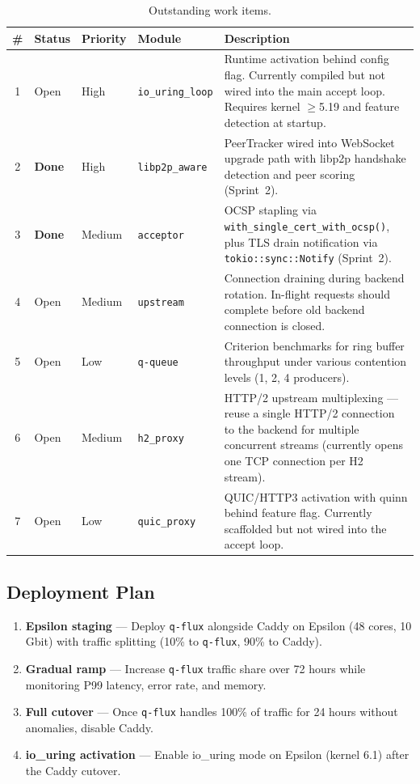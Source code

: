 \documentclass[a4paper, 11pt]{article}
\newcommand{\qflux}{\texttt{q-flux}}
\begin{document}
\begin{table}[H]
\centering
\caption{Outstanding work items.}
\label{tab:remaining}
\begin{tabular}{@{}clllp{5.5cm}@{}}
\toprule
\textbf{\#} & \textbf{Status} & \textbf{Priority} & \textbf{Module} & \textbf{Description} \\
\midrule
1 & Open   & High   & \texttt{io\_uring\_loop} &
  Runtime activation behind config flag.  Currently compiled but not
  wired into the main accept loop.  Requires kernel $\geq$5.19 and
  feature detection at startup. \\
2 & \textcolor{codegreen}{\textbf{Done}} & High   & \texttt{libp2p\_aware} &
  PeerTracker wired into WebSocket upgrade path with libp2p handshake
  detection and peer scoring (Sprint~2). \\
3 & \textcolor{codegreen}{\textbf{Done}} & Medium & \texttt{acceptor} &
  OCSP stapling via \texttt{with\_single\_cert\_with\_ocsp()}, plus
  TLS drain notification via \texttt{tokio::sync::Notify} (Sprint~2). \\
4 & Open   & Medium & \texttt{upstream} &
  Connection draining during backend rotation.  In-flight requests
  should complete before old backend connection is closed. \\
5 & Open   & Low    & \texttt{q-queue} &
  Criterion benchmarks for ring buffer throughput under various
  contention levels (1, 2, 4 producers). \\
6 & Open   & Medium & \texttt{h2\_proxy} &
  HTTP/2 upstream multiplexing --- reuse a single HTTP/2 connection to
  the backend for multiple concurrent streams (currently opens one TCP
  connection per H2 stream). \\
7 & Open   & Low    & \texttt{quic\_proxy} &
  QUIC/HTTP3 activation with quinn behind feature flag.  Currently
  scaffolded but not wired into the accept loop. \\
\bottomrule
\end{tabular}
\end{table}

\subsection{Deployment Plan}

\begin{enumerate}[nosep]
  \item \textbf{Epsilon staging} --- Deploy \qflux{} alongside Caddy on
        Epsilon (48 cores, 10\,Gbit) with traffic splitting (10\% to
        \qflux{}, 90\% to Caddy).
  \item \textbf{Gradual ramp} --- Increase \qflux{} traffic share over
        72 hours while monitoring P99 latency, error rate, and memory.
  \item \textbf{Full cutover} --- Once \qflux{} handles 100\% of traffic
        for 24 hours without anomalies, disable Caddy.
  \item \textbf{io\_uring activation} --- Enable io\_uring mode on
        Epsilon (kernel 6.1) after the Caddy cutover.
\end{enumerate}
\end{document}
